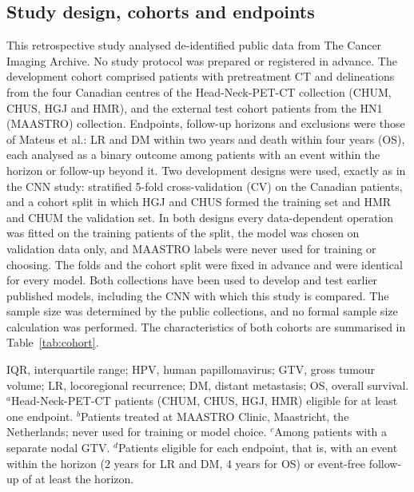 \documentclass[11pt,a4paper]{article}
\newcommand{\tabnote}[1]{\par\vspace{3pt}\begin{minipage}{\linewidth}\footnotesize #1\end{minipage}}
\begin{document}
\subsection{Study design, cohorts and endpoints}
This retrospective study analysed de-identified public data from The Cancer Imaging Archive. No study protocol was prepared or registered in advance. The development cohort comprised \nPatCan{} patients with pretreatment CT and delineations from the four Canadian centres of the Head-Neck-PET-CT collection (CHUM, CHUS, HGJ and HMR)\cite{vallieres2017,vallieres2017tcia}, and the external test cohort \nPatMAA{} patients from the HN1 (MAASTRO) collection\cite{aerts2014,wee2019hn1}. Endpoints, follow-up horizons and exclusions were those of Mateus et al.\cite{mateus2023}: LR and DM within two years and death within four years (OS), each analysed as a binary outcome among patients with an event within the horizon or follow-up beyond it. Two development designs were used, exactly as in the CNN study: stratified 5-fold cross-validation (CV) on the Canadian patients, and a cohort split in which HGJ and CHUS formed the training set and HMR and CHUM the validation set\cite{diamant2019,mateus2023}. In both designs every data-dependent operation was fitted on the training patients of the split, the model was chosen on validation data only, and MAASTRO labels were never used for training or choosing. The folds and the cohort split were fixed in advance and were identical for every model. Both collections have been used to develop and test earlier published models, including the CNN with which this study is compared\cite{vallieres2017,diamant2019,mateus2023,kazmierski2023}. The sample size was determined by the public collections, and no formal sample size calculation was performed. The characteristics of both cohorts are summarised in Table~\ref{tab:cohort}.

\begin{table}[!htb]
\caption{Patient characteristics, tumour delineation and outcome cohorts.}\label{tab:cohort}
\centering\small

\tabnote{IQR, interquartile range; HPV, human papillomavirus; GTV, gross tumour volume; LR, locoregional recurrence; DM, distant metastasis; OS, overall survival. $^{a}$Head-Neck-PET-CT patients (CHUM, CHUS, HGJ, HMR) eligible for at least one endpoint. $^{b}$Patients treated at MAASTRO Clinic, Maastricht, the Netherlands; never used for training or model choice. $^{c}$Among patients with a separate nodal GTV. $^{d}$Patients eligible for each endpoint, that is, with an event within the horizon (2 years for LR and DM, 4 years for OS) or event-free follow-up of at least the horizon.}
\end{table}
\end{document}
